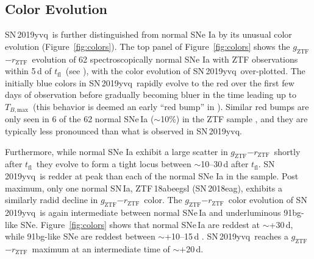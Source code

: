 \documentclass[twocolumn]{aastex63}
\newcommand{\rztf}{$r_\mathrm{ZTF}$}
\newcommand{\gztf}{$g_\mathrm{ZTF}$}
\newcommand{\tfl}{$t_\mathrm{fl}$}
\newcommand{\tbmax}{$T_{B,\mathrm{max}}$}
\newcommand{\sn}{SN\,2019yvq}
\begin{document}
\subsection{Color Evolution}

\sn\ is further distinguished from normal SNe Ia by its unusual color
evolution (Figure~\ref{fig:colors}). The top panel of Figure~\ref{fig:colors}
shows the \gztf$ - $\rztf\ evolution of 62 spectroscopically normal SNe Ia
with ZTF observations within 5\,d of \tfl\ (see \citealt{Bulla20}), with the
color evolution of \sn\ over-plotted. The initially blue colors in \sn\
rapidly evolve to the red over the first few days of observation before
gradually becoming bluer in the time leading up to \tbmax\ (this behavior is
deemed an early ``red bump'' in \citealt{Bulla20}). Similar red bumps are only
seen in 6 of the 62 normal SNe\,Ia ($\sim$10\%) in the ZTF sample
\citep{Bulla20}, and they are typically less pronounced than what is observed
in \sn.

Furthermore, while normal SNe Ia exhibit a large scatter in
\gztf$ - $\rztf\ shortly after \tfl\ they evolve to form a tight locus between
$\sim$10--30\,d after \tfl. \sn\ is redder at peak than each of the normal SNe
Ia in the \citet{Bulla20} sample. Post maximum, only one normal SN\,Ia,
ZTF\,18abeegsl (SN\,2018eag), exhibits a similarly radid decline in \gztf$ -
$\rztf\ color. The \gztf$ - $\rztf\ color evolution of \sn\ is again
intermediate between normal SNe\,Ia and underluminous 91bg-like SNe.
Figure~\ref{fig:colors} shows that normal SNe\,Ia are reddest at $\sim$+30\,d,
while 91bg-like SNe are reddest between $\sim$+10--15\,d \citep{Burns14}. \sn\
reaches a \gztf$-$\rztf\ maximum at an intermediate time of $\sim$+20\,d.
\end{document}
